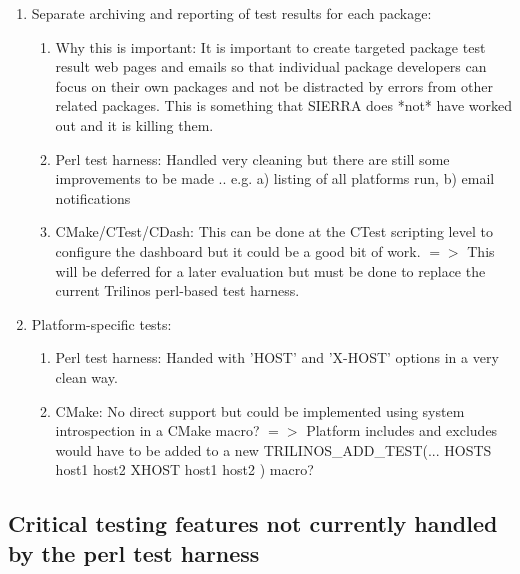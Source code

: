 \documentclass[pdf,ps2pdf,11pt]{SANDreport}
\begin{document}
\begin{enumerate}
\begin{enumerate}
  \end{enumerate}

{}\item Separate archiving and reporting of test results for each
package:

  \begin{enumerate}

  {}\item Why this is important: It is important to create targeted
  package test result web pages and emails so that individual
  package developers can focus on their own packages and not be
  distracted by errors from other related packages.  This is
  something that SIERRA does *not* have worked out and it is killing
  them.

  {}\item Perl test harness: Handled very cleaning but there are
  still some improvements to be made .. e.g. a) listing of all
  platforms run, b) email notifications

  {}\item CMake/CTest/CDash: This can be done at the CTest scripting
  level to configure the dashboard but it could be a good bit of
  work. $=>$ This will be deferred for a later evaluation but must
  be done to replace the current Trilinos perl-based test harness.

  \end{enumerate}

{}\item Platform-specific tests:

  \begin{enumerate}

  {}\item Perl test harness: Handed with 'HOST' and 'X-HOST' options
  in a very clean way.

  {}\item CMake: No direct support but could be implemented using
  system introspection in a CMake macro?  $=>$ Platform includes and
  excludes would have to be added to a new TRILINOS\_ADD\_TEST(...
  HOSTS host1 host2 XHOST host1 host2 ) macro?

  \end{enumerate}

\end{enumerate}

%
{}\subsection{Critical testing features not currently handled by the perl
test harness}
%
\end{document}
